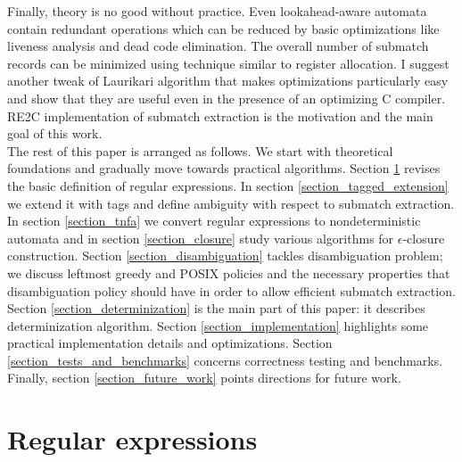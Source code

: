 \documentclass{article}
\theoremstyle{definition}
\begin{document}
\begin{multicols}{2}
Finally, theory is no good without practice.
Even lookahead-aware automata contain redundant operations
which can be reduced by basic optimizations like liveness analysis and dead code elimination.
The overall number of submatch records can be minimized using technique similar to register allocation.
I suggest another tweak of Laurikari algorithm that makes optimizations particularly easy
and show that they are useful even in the presence of an optimizing C compiler.
RE2C implementation of submatch extraction is the motivation and the main goal of this work.
\\

The rest of this paper is arranged as follows.
We start with theoretical foundations and gradually move towards practical algorithms.
Section \ref{section_regular_expressions} revises the basic definition of regular expressions.
In section \ref{section_tagged_extension} we extend it with tags
and define ambiguity with respect to submatch extraction.
In section \ref{section_tnfa} we convert regular expressions to nondeterministic automata
and in section \ref{section_closure} study various algorithms for $\epsilon$-closure construction.
Section \ref{section_disambiguation} tackles disambiguation problem;
we discuss leftmost greedy and POSIX policies and the necessary properties that disambiguation policy should have in order to allow efficient submatch extraction.
Section \ref{section_determinization} is the main part of this paper: it describes determinization algorithm.
Section \ref{section_implementation} highlights some practical implementation details and optimizations.
Section \ref{section_tests_and_benchmarks} concerns correctness testing and benchmarks.
Finally, section \ref{section_future_work} points directions for future work.

\section{Regular expressions}\label{section_regular_expressions}


\end{multicols}
\end{document}

